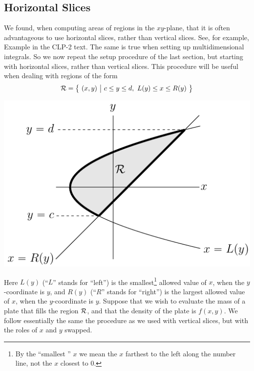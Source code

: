 \subsection{Horizontal Slices}\label{sec_horizontal_slices}
We found, when computing areas of regions in the $xy$-plane, that
it is often advantageous to use horizontal slices, rather than vertical
slices. See, for example,
Example  in the CLP-2 text.
The same is true when setting up multidimensional integrals. So we now repeat
the setup procedure of the last section, but starting with horizontal slices, 
rather than vertical slices. This procedure will be useful when 
dealing with regions of the form
\begin{equation*}
\cR = \big\{\ (x,y)\ \big|\ c\le y\le d,\ L(y)\le x\le R(y)\ \big\}
\end{equation*}
\begin{efig}
\begin{center}
   \includegraphics{hSliceA.pdf}
\end{center}
\end{efig}
Here $L(y)$ (``$L$'' stands for ``left'') is the smallest\footnote{
By the ``smallest '' $x$ we mean the $x$ farthest to the left along 
the number line, not the $x$ closest to $0$.} allowed 
value of $x$, when the $y$-coordinate is $y$, and 
$R(y)$ (``$R$'' stands for ``right'') is the largest allowed value 
of $x$, when the $y$-coordinate is $y$.
Suppose that we wish to evaluate the mass of a plate that
fills the region $\mathcal{R}$, and that the density of the plate is $f(x,y)$. 
We follow essentially the same the procedure as we used 
with vertical slices, but with the roles of $x$ and $y$ swapped.
